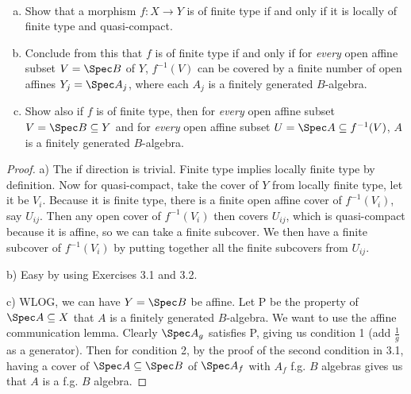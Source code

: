 \begin{exercise}%
	~
	\begin{enumerate}[(a)]
		\item Show that a morphism $f: X\to Y $ is of finite type if and only if it is locally of finite type and quasi-compact.
		\item Conclude from this that $f $ is of finite type if and only if for \textit{every} open affine subset $V = \Spec B $ of $Y $, $f^{-1}(V) $ can be covered by a finite number of open affines $Y_j = \Spec A_j $, where each $A_j $ is a finitely generated $B $-algebra.
		\item Show also if $f $ is of finite type, then for \textit{every} open affine subset $V = \Spec B \subseteq  Y $ and for \textit{every} open affine subset $U = \Spec A \subseteq f^{-1}(V) $, $A $ is a finitely generated $B $-algebra.
	\end{enumerate}
\end{exercise}
\begin{proof}
	a) The if direction is trivial.
	Finite type implies locally finite type by definition.
	Now for quasi-compact, take the cover of $Y $ from locally finite type, let it be $V_i $.
	Because it is finite type, there is a finite open affine cover of $f^{-1}(V_i) $, say $U_{ij} $.
	Then any open cover of $f^{-1}(V_i) $ then covers $U_{ij} $, which is quasi-compact because it is affine, so we can take a finite subcover.
	We then have a finite subcover of $f^{-1}(V_i) $ by putting together all the finite subcovers from $U_{ij} $.

	b) Easy by using Exercises 3.1 and 3.2.

	c) WLOG, we can have $Y=\Spec B $ be affine. Let P be the property of $\Spec A \subseteq X$ that $A $ is a finitely generated $B $-algebra.
	We want to use the affine communication lemma.
	Clearly $\Spec A_g $ satisfies P, giving us condition 1 (add $\frac{1}{g} $ as a generator).
	Then for condition 2, by the proof of the second condition in 3.1, having a cover of $\Spec A\subseteq \Spec B $ of $\Spec A_f $ with $A_f $ f.g. $B $ algebras gives us that $A $ is a f.g. $B $ algebra.
\end{proof}

